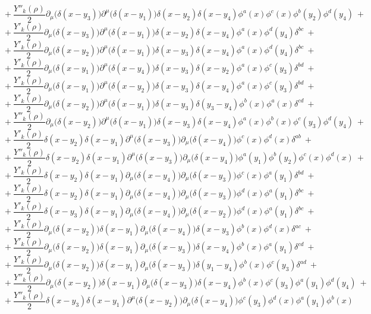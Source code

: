 $$+\ \frac{Y''_k(\rho)}{2}\partial_\mu\big(\delta(x - y_3)\big)\partial^\mu\big(\delta(x - y_1)\big)\delta(x - y_2)\delta(x - y_4)\phi^a(x)\phi^c(x)\phi^b(y_2)\phi^d(y_4) \ +$$
$$+\ \frac{Y'_k(\rho)}{2}\partial_\mu\big(\delta(x - y_3)\big)\partial^\mu\big(\delta(x - y_1)\big)\delta(x - y_2)\delta(x - y_4)\phi^a(x)\phi^d(y_4)\delta^{bc} \ +$$
$$+\ \frac{Y'_k(\rho)}{2}\partial_\mu\big(\delta(x - y_2)\big)\partial^\mu\big(\delta(x - y_1)\big)\delta(x - y_3)\delta(x - y_4)\phi^a(x)\phi^d(y_4)\delta^{bc} \ +$$
$$+\ \frac{Y'_k(\rho)}{2}\partial_\mu\big(\delta(x - y_1)\big)\partial^\mu\big(\delta(x - y_4)\big)\delta(x - y_3)\delta(x - y_2)\phi^a(x)\phi^c(y_3)\delta^{bd} \ +$$
$$+\ \frac{Y'_k(\rho)}{2}\partial_\mu\big(\delta(x - y_1)\big)\partial^\mu\big(\delta(x - y_2)\big)\delta(x - y_3)\delta(x - y_4)\phi^a(x)\phi^c(y_3)\delta^{bd} \ +$$
$$+\ \frac{Y'_k(\rho)}{2}\partial_\mu\big(\delta(x - y_2)\big)\partial^\mu\big(\delta(x - y_1)\big)\delta(x - y_3)\delta(y_3 - y_4)\phi^b(x)\phi^a(x)\delta^{cd} \ +$$
$$+\ \frac{Y''_k(\rho)}{2}\partial_\mu\big(\delta(x - y_2)\big)\partial^\mu\big(\delta(x - y_1)\big)\delta(x - y_3)\delta(x - y_4)\phi^a(x)\phi^b(x)\phi^c(y_3)\phi^d(y_4) \ +$$
$$+\ \frac{Y'_k(\rho)}{2}\delta(x - y_2)\delta(x - y_1)\partial^\mu\big(\delta(x - y_3)\big)\partial_\mu\big(\delta(x - y_4)\big)\phi^c(x)\phi^d(x)\delta^{ab} \ +$$
$$+\ \frac{Y''_k(\rho)}{2}\delta(x - y_2)\delta(x - y_1)\partial^\mu\big(\delta(x - y_3)\big)\partial_\mu\big(\delta(x - y_4)\big)\phi^a(y_1)\phi^b(y_2)\phi^c(x)\phi^d(x) \ +$$
$$+\ \frac{Y'_k(\rho)}{2}\delta(x - y_2)\delta(x - y_1)\partial_\mu\big(\delta(x - y_4)\big) \partial_\mu\big(\delta(x - y_3)\big)\phi^c(x)\phi^a(y_1)\delta^{bd} \ +$$
$$+\ \frac{Y'_k(\rho)}{2}\delta(x - y_2)\delta(x - y_1)\partial_\mu\big(\delta(x - y_4)\big) \partial_\mu\big(\delta(x - y_3)\big)\phi^d(x)\phi^a(y_1)\delta^{bc} \ +$$
$$+\ \frac{Y'_k(\rho)}{2}\delta(x - y_3)\delta(x - y_1)\partial_\mu\big(\delta(x - y_4)\big) \partial_\mu\big(\delta(x - y_2)\big)\phi^d(x)\phi^a(y_1)\delta^{bc} \ +$$
$$+\ \frac{Y'_k(\rho)}{2}\partial_\mu\big(\delta(x - y_2)\big)\delta(x - y_1)\partial_\mu\big(\delta(x - y_4)\big)\delta(x - y_3)\phi^b(x)\phi^d(x)\delta^{ac} \ +$$
$$+\ \frac{Y'_k(\rho)}{2}\partial_\mu\big(\delta(x - y_2)\big)\delta(x - y_1)\partial_\mu\big(\delta(x - y_3)\big)\delta(x - y_4)\phi^b(x)\phi^a(y_1)\delta^{cd} \ +$$
$$+\ \frac{Y'_k(\rho)}{2}\partial_\mu\big(\delta(x - y_2)\big)\delta(x - y_1)\partial_\mu\big(\delta(x - y_3)\big)\delta(y_1 - y_4)\phi^b(x)\phi^c(y_3) \delta^{ad} \ +$$
$$+\ \frac{Y''_k(\rho)}{2}\partial_\mu\big(\delta(x - y_2)\big)\delta(x - y_1)\partial_\mu\big(\delta(x - y_3)\big)\delta(x - y_4)\phi^b(x)\phi^c(y_3) \phi^a(y_1) \phi^d(y_4)  \ +$$
$$+\ \frac{Y''_k(\rho)}{2}\delta(x - y_3)\delta(x - y_1)\partial^\mu\big(\delta(x - y_2)\big)\partial_\mu\big(\delta(x - y_4)\big)\phi^c(y_3)\phi^d(x)\phi^a(y_1)\phi^b(x)$$





